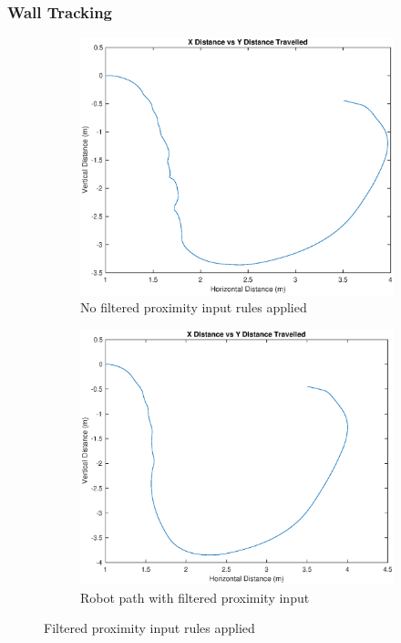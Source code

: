 \documentclass[11pt]{article}
\begin{document}
\subsubsection{Wall Tracking}
\begin{figure}[H]
    \centering
    \begin{subfigure}{.5\textwidth}
      \centering
      \includegraphics[scale=0.4]{./figures/SharpTurn_noFilt.eps}
      \caption{No filtered proximity input rules applied}
      \label{fig:sub1}
    \end{subfigure}%
    \begin{subfigure}{.5\textwidth}
      \centering
      \includegraphics[scale=0.4]{./figures/SharpTurn_withFilt.eps}
      \caption{Robot path with filtered proximity input}
      \label{fig:sub2}
    \end{subfigure}
    \caption{Filtered proximity input rules applied}
    \label{fig:wallFilter}
    \end{figure}
\end{document}
